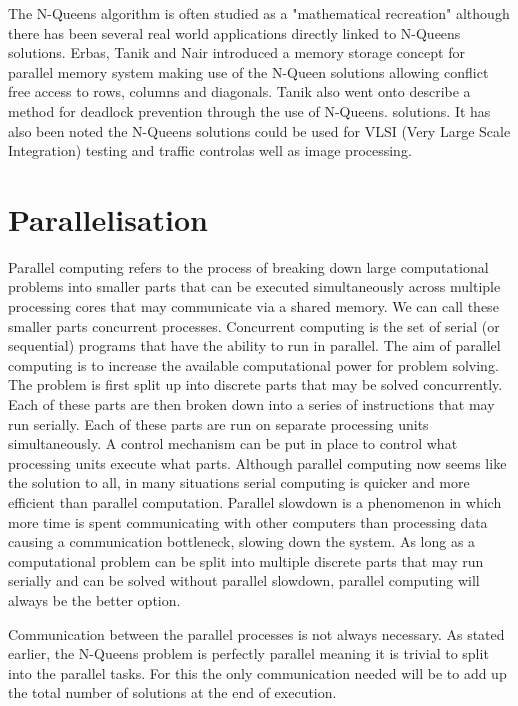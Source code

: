 The N-Queens algorithm is often studied as a "mathematical recreation" although there has been several real world applications directly linked to N-Queens solutions. Erbas, Tanik and Nair introduced a memory storage concept for parallel memory system making use of the N-Queen solutions allowing conflict free access to rows, columns and diagonals\cite{erbas1993circulant}. Tanik also went onto describe a method for deadlock prevention through the use of N-Queens. solutions\cite{tanik1978graph}. It has also been noted the N-Queens solutions could be used for VLSI (Very Large Scale Integration) testing and traffic control\cite{sosic1990polynomial}as well as image processing\cite{wang2006fast}. 

\section{Parallelisation}\label{sec:background_parallelisation } 
Parallel computing refers to the process of breaking down large computational problems into smaller parts that can be executed simultaneously across multiple processing cores that may communicate    via a shared memory. We can call these smaller parts concurrent processes. Concurrent computing is the set of serial (or sequential) programs that have the ability to run in parallel\cite{ben2006principles}. The aim of parallel computing is to increase the available computational power for problem solving. The problem is first split up into discrete parts that may be solved concurrently. Each of these parts are then broken down into a series of instructions that may run serially. Each of these parts are run on separate processing units simultaneously. A control mechanism can be put in place to control what processing units execute what parts. Although parallel computing now seems like the solution to all, in many situations serial computing is quicker and more efficient than parallel computation. Parallel slowdown is a phenomenon in which more time is spent communicating with other computers than processing data causing a communication bottleneck, slowing down the system. As long as a computational problem can be split into multiple discrete parts that may run serially and can be solved without parallel slowdown, parallel computing will always be the better option.

Communication between the parallel processes is not always necessary. As stated earlier, the N-Queens problem is perfectly parallel meaning it is trivial to split into the parallel tasks. For this the only communication needed will be to add up the total number of solutions at the end of execution.

